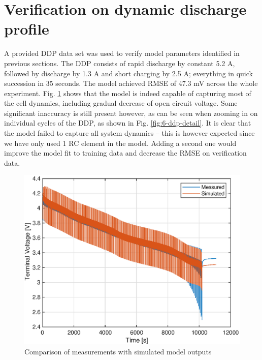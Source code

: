 \section{Verification on dynamic discharge profile}

A provided DDP data set was used to verify model parameters identified in previous sections. The DDP consists of rapid discharge by constant 5.2 A, followed by discharge by 1.3 A and short charging by 2.5 A; everything in quick succession in 35 seconds. The model achieved RMSE of 47.3 mV across the whole experiment. Fig. \ref{fig:6-ddp-macro} shows that the model is indeed capable of capturing most of the cell dynamics, including gradual decrease of open circuit voltage. Some significant inaccuracy is still present however, as can be seen when zooming in on individual cycles of the DDP, as shown in Fig. \ref{fig:6-ddp-detail}. It is clear that the model failed to capture all system dynamics -- this is however expected since we have only used 1 RC element in the model. Adding a second one would improve the model fit to training data and decrease the RMSE on verification data. 

\begin{figure}
    \centering
    \includegraphics{figures/6/ddp-macro.eps}
    \caption{Comparison of measurements with simulated model outputs}
    \label{fig:6-ddp-macro}
\end{figure}

